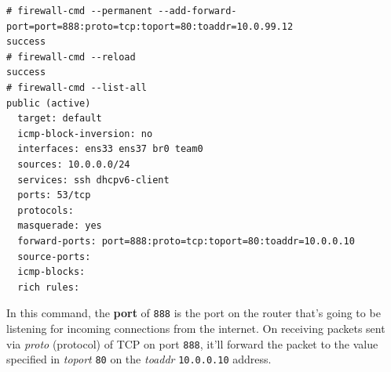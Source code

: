 \vspace{-15pt}
\begin{verbatim}
# firewall-cmd --permanent --add-forward-port=port=888:proto=tcp:toport=80:toaddr=10.0.99.12
success
# firewall-cmd --reload
success
# firewall-cmd --list-all
public (active)
  target: default
  icmp-block-inversion: no
  interfaces: ens33 ens37 br0 team0
  sources: 10.0.0.0/24
  services: ssh dhcpv6-client
  ports: 53/tcp
  protocols: 
  masquerade: yes
  forward-ports: port=888:proto=tcp:toport=80:toaddr=10.0.0.10
  source-ports: 
  icmp-blocks: 
  rich rules: 
\end{verbatim}
\vspace{-10pt}	

\noindent
In this command, the \textbf{port} of \verb|888| is the port on the router that's going to be listening for incoming connections from the internet. On receiving packets sent via \textit{proto} (protocol) of TCP on port \verb|888|, it'll forward the packet to the value specified in \textit{toport} \verb|80| on the \textit{toaddr} \verb|10.0.0.10| address. 